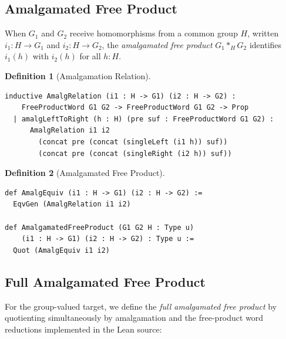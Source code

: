 \documentclass{lmcs}
\theoremstyle{definition}
\newtheorem{definition}{Definition}[section]
\theoremstyle{plain}
\theoremstyle{remark}
\newcommand{\AmalgProduct}{\ast}
\begin{document}
\subsection{Amalgamated Free Product}

When $G_1$ and $G_2$ receive homomorphisms from a common group $H$, written $i_1 : H \to G_1$ and $i_2 : H \to G_2$, the \emph{amalgamated free product} $G_1 \AmalgProduct_H G_2$ identifies $i_1(h)$ with $i_2(h)$ for all $h : H$.

\begin{definition}[Amalgamation Relation]
\leavevmode
\begin{lstlisting}
inductive AmalgRelation (i1 : H -> G1) (i2 : H -> G2) :
    FreeProductWord G1 G2 -> FreeProductWord G1 G2 -> Prop
  | amalgLeftToRight (h : H) (pre suf : FreeProductWord G1 G2) :
      AmalgRelation i1 i2
        (concat pre (concat (singleLeft (i1 h)) suf))
        (concat pre (concat (singleRight (i2 h)) suf))
\end{lstlisting}
\end{definition}

\begin{definition}[Amalgamated Free Product]
\leavevmode
\begin{lstlisting}
def AmalgEquiv (i1 : H -> G1) (i2 : H -> G2) :=
  EqvGen (AmalgRelation i1 i2)

def AmalgamatedFreeProduct (G1 G2 H : Type u)
    (i1 : H -> G1) (i2 : H -> G2) : Type u :=
  Quot (AmalgEquiv i1 i2)
\end{lstlisting}
\end{definition}

\subsection{Full Amalgamated Free Product}

For the group-valued target, we define the \emph{full amalgamated free product}
by quotienting simultaneously by amalgamation and the free-product word
reductions implemented in the Lean source:
\end{document}
